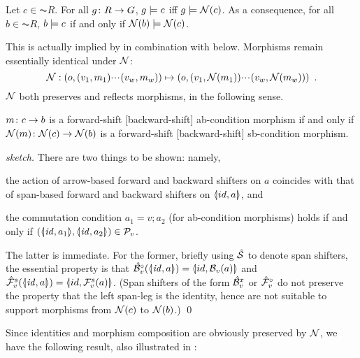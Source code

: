\begin{proposition}
Let $c\in \AC R$. For all $g\colon R\rightarrow G$, $g\models c$ iff $g\models\mathcal{N}(c)$. As a consequence, for all $b\in \AC R$, $b\models c$ if and only if $\mathcal{N}(b)\models \mathcal{N}(c)$.
\end{proposition}
%
This is actually implied by  in combination with  below. Morphisms remain essentially identical under $\mathcal{N}$:
%
\[ \mathcal{N}: (o,(v_1,m_1){\cdotp\mkern-2mu\cdotp\mkern-2mu\cdotp\mkern1mu} (v_w,m_w)) \mapsto (o,(v_1,\mathcal{N}(m_1)){\cdotp\mkern-2mu\cdotp\mkern-2mu\cdotp\mkern1mu} (v_w,\mathcal{N}(m_w))) \enspace. \]
%
$\mathcal{N}$ both preserves and reflects morphisms, in the following sense.
%
\begin{proposition}
$m\colon c\rightarrow b$ is a forward-shift [backward-shift] ab-condition morphism if and only if $\mathcal{N}(m)\colon \mathcal{N}(c)\rightarrow \mathcal{N}(b)$ is a forward-shift [backward-shift] sb-condition morphism.
\end{proposition}
%
\begin{proof}[sketch]
There are two things to be shown: namely,
\begin{enumerate*}[label=\emph{(\roman*)}]
\item the action of arrow-based forward and backward shifters on $a$ coincides with that of span-based forward and backward shifters on $\spanof{id}{a}$, and
\item the commutation condition $a_1=v;a_2$ (for ab-condition morphisms) holds if and only if $(\spanof{\id}{a_1},\spanof{\id}{a_2})\in \cP_v$.
\end{enumerate*}
The latter is immediate. For the former, briefly using $\hat {\mathcal{S}}$ to denote span shifters, the essential property is that $\hat\cB_v^\circ(\spanof{\id}{a})=\spanof{id}{\cB_v(a)}$ and $\hat\cF_v^s(\spanof{\id}{a})=\spanof{id}{\cF_v^s(a)}$. (Span shifters of the form $\hat{\mathcal{B}}_v^x$ or $\hat{\mathcal{F}}_v^\circ$ do not preserve the property that the left span-leg is the identity, hence are not suitable to support morphisms from $\mathcal{N}(c)$ to $\mathcal{N}(b)$.)
\qed
\end{proof}
%
Since identities and morphism composition are obviously preserved by $\mathcal{N}$, we have the following result, also illustrated in :

